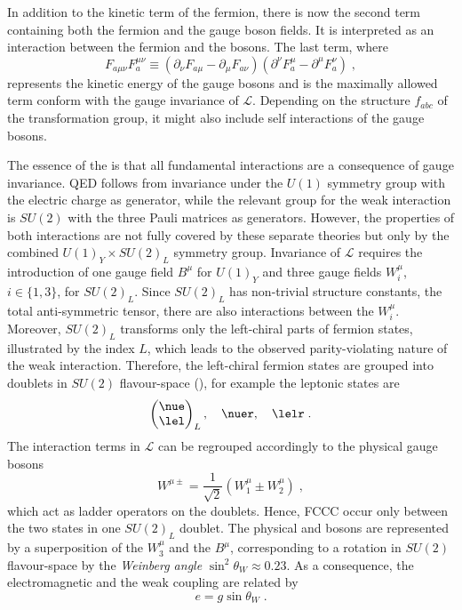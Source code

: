 In addition to the kinetic term of the fermion, there is now the second term containing both the fermion and the gauge boson fields.
It is interpreted as an interaction between the fermion and the bosons.
The last term, where
\begin{equation*}
  F_{a\mu\nu}F^{\mu\nu}_{a} \equiv \left(\partial_{\nu}F_{a\mu} - \partial_{\mu}F_{a\nu}\right)\left(\partial^{\nu}F_{a}^{\mu} - \partial^{\mu}F_{a}^{\nu}\right) \;,
\end{equation*}
represents the kinetic energy of the gauge bosons and is the maximally allowed term conform with the gauge invariance of $\mathcal{L}$.
Depending on the structure $f_{abc}$ of the transformation group, it might also include self interactions of the gauge bosons.

The essence of the \sm is that all fundamental interactions are a consequence of gauge invariance.
QED follows from invariance under the $U(1)$ symmetry group with the electric charge as generator, while the relevant group for the weak interaction is $SU(2)$ with the three Pauli matrices as generators.
However, the properties of both interactions are not fully covered by these separate theories but only by the combined \mbox{$U(1)_{Y}\times SU(2)_{L}$} symmetry group.
Invariance of $\mathcal{L}$ requires the introduction of one gauge field $B^{\mu}$ for $U(1)_{Y}$ and three gauge fields $W^{\mu}_{i}$, \mbox{$i\in\{1,3\}$}, for $SU(2)_{L}$.
Since $SU(2)_{L}$ has non-trivial structure constants, the total anti-symmetric tensor, there are also interactions between the $W^{\mu}_{i}$.
Moreover, $SU(2)_{L}$ transforms only the left-chiral parts of fermion states, illustrated by the index $L$, which leads to the observed parity-violating nature of the weak interaction.
Therefore, the left-chiral fermion states are grouped into doublets in $SU(2)$ flavour-space (\cf {}), for example the leptonic states are
\begin{equation*}
  \begin{pmatrix} \nue \\ \lel \\  \end{pmatrix}_{L},\quad\nuer,\quad\lelr\;.
\end{equation*}
The interaction terms in $\mathcal{L}$ can be regrouped accordingly to the physical gauge bosons
\begin{equation*}
  W^{\mu\pm} = \frac{1}{\sqrt{2}}\left(W^{\mu}_{1} \pm W^{\mu}_{2}\right) \;,
\end{equation*}
which act as ladder operators on the doublets.
Hence, FCCC occur only between the two states in one $SU(2)_{L}$ doublet.
The physical \photon and \Z bosons are represented by a superposition of the $W^{\mu}_{3}$ and the $B^{\mu}$, corresponding to a rotation in $SU(2)$ flavour-space by the \emph{Weinberg angle} \mbox{$\sin^{2}\theta_{W}\approx0.23$}.
As a consequence, the electromagnetic and the weak coupling are related by
\begin{equation*}
  e = g\sin\theta_{W} \;.
\end{equation*}

